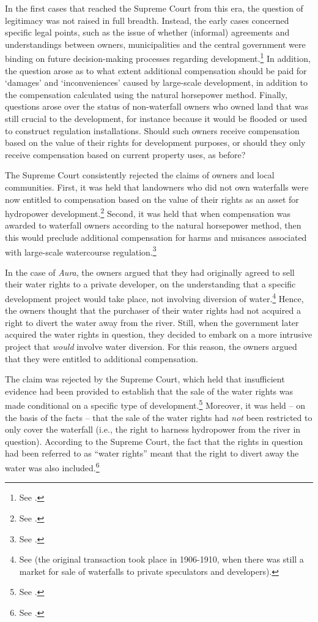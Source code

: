 In the first cases that reached the Supreme Court from this era, the question of legitimacy was not raised in full breadth. Instead, the early cases concerned specific legal points, such as the issue of whether (informal) agreements and understandings between owners, municipalities and the central government were binding on future decision-making processes regarding development.\footnote{See \cite{aura61,mardola73}.} In addition, the question arose as to what extent additional compensation should be paid for `damages' and `inconveniences' caused by large-scale development, in addition to the compensation calculated using the natural horsepower method. Finally, questions arose over the status of non-waterfall owners who owned land that was still crucial to the development, for instance because it would be flooded or used to construct regulation installations. Should such owners receive compensation based on the value of their rights for development purposes, or should they only receive compensation based on current property uses, as before?

The Supreme Court consistently rejected the claims of owners and local communities. First, it was held that landowners who did not own waterfalls were now entitled to compensation based on the value of their rights as an asset for hydropower development.\footnote{See \cite[332-333]{tokke63}.} Second, it was held that when compensation was awarded to waterfall owners according to the natural horsepower method, then this would preclude additional compensation for harms and nuisances associated with large-scale watercourse regulation.\footnote{See  \cite{vikfalli71,driva82}.}

In the case of {\it Aura}, the owners argued that they had originally agreed to sell their water rights to a private developer, on the understanding that a specific development project would take place, not involving diversion of water.\footnote{See \cite[1284]{aura61} (the original transaction took place in 1906-1910, when there was still a market for sale of waterfalls to private speculators and developers).} Hence, the owners thought that the purchaser of their water rights had not acquired a right to divert the water away from the river. Still, when the government later acquired the water rights in question, they decided to embark on a more intrusive project that {\it would} involve water diversion. For this reason, the owners argued that they were entitled to additional compensation. 

The claim was rejected by the Supreme Court, which held that insufficient evidence had been provided to establish that the sale of the water rights was made conditional on a specific type of development.\footnote{See \cite[1285-1286]{aura61}.} Moreover, it was held -- on the basis of the facts -- that the sale of the water rights had {\it not} been restricted to only cover the waterfall (i.e., the right to harness hydropower from the river in question). According to the Supreme Court, the fact that the rights in question had been referred to as ``water rights'' meant that the right to divert away the water was also included.\footnote{See \cite[1284-1285]{aura61}.}

